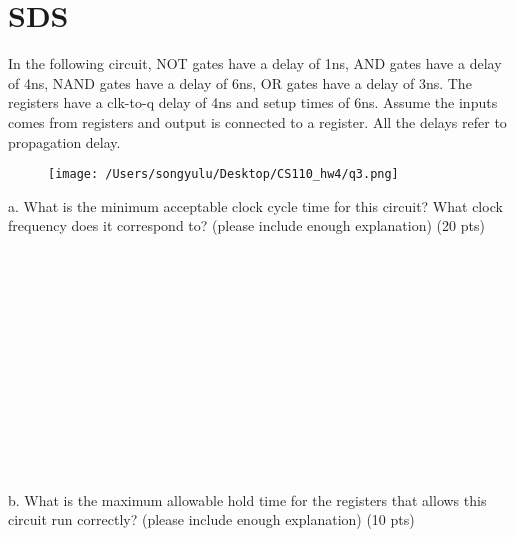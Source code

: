 \documentclass{article}
\begin{document}
\newpage

\section{SDS}

In the following circuit, NOT gates have a delay of 1ns, AND gates have a delay of 4ns, NAND gates have a delay of 6ns, OR gates have a delay of 3ns. The registers have a clk-to-q delay of 4ns and setup times of 6ns. Assume the inputs comes from registers and output is connected to a register. All the delays refer to propagation delay.\par
\begin{figure}[htbp]
	\centering
	\texttt{[image: /Users/songyulu/Desktop/CS110\_hw4/q3.png]}
	\label{fig:1}
\end{figure}
\noindent a. What is the minimum acceptable clock cycle time for this circuit? What clock frequency does it correspond to?  (please include enough explanation){\color{red} (20 pts)}
~\\
~\\
~\\
~\\
~\\
~\\
~\\
~\\
~\\
~\\
~\\
~\\
~\\
~\\

\noindent b. What is the maximum allowable hold time for the registers that allows this circuit run correctly? (please include enough explanation){\color{red} (10 pts)}
\end{document}
